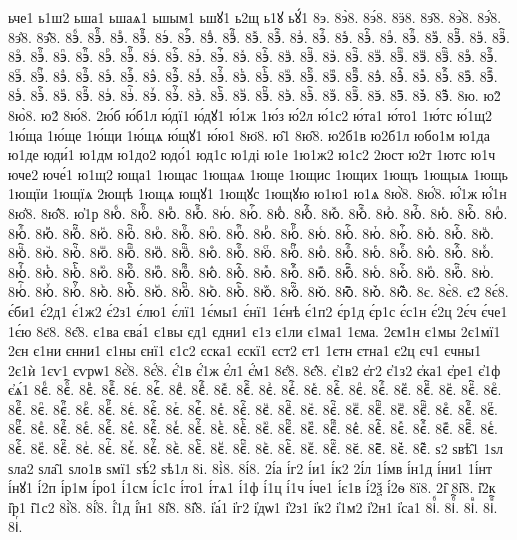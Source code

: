 {ьче1
ь1ш2
ьша1
ьшаѧ1
ьшым1
ьшꙋ1
ь2щ
ь1ꙋ
ьꙋ́1
8э.
8э̀8.
8э́8.
8ӭ8.
8э̑8.
8э҆̀8.
8э҆́8.
8э҆̈8.
8э҆̑8.
8эⷠ.
8эⷠ҇.
8эⷡ.
8эⷡ҇.
8эⷢ.
8эⷢ҇.
8эⷣ.
8эⷣ҇.
8эⷤ.
8эⷤ҇.
8эⷥ.
8эⷥ҇.
8эⷦ.
8эⷦ҇.
8эⷧ.
8эⷧ҇.
8эⷨ.
8эⷨ҇.
8эⷩ.
8эⷩ҇.
8эⷪ.
8эⷪ҇.
8эⷫ.
8эⷫ҇.
8эⷬ.
8эⷬ҇.
8эⷭ.
8эⷭ҇.
8эⷮ.
8эⷮ҇.
8эⷯ.
8эⷯ҇.
8эⷰ.
8эⷰ҇.
8эⷱ.
8эⷱ҇.
8эⷲ.
8эⷲ҇.
8эⷳ.
8эⷳ҇.
8эⷴ.
8эⷴ҇.
8эⷵ.
8эⷵ҇.
8эⷶ.
8эⷶ҇.
8эⷷ.
8эⷷ҇.
8эⷸ.
8эⷸ҇.
8эⷹ.
8эⷹ҇.
8эⷺ.
8эⷺ҇.
8эⷻ.
8эⷻ҇.
8эⷼ.
8эⷼ҇.
8эⷽ.
8эⷽ҇.
8эⷾ.
8эⷾ҇.
8эⷿ.
8эⷿ҇.
8эꙴ.
8эꙴ҇.
8эꙵ.
8эꙵ҇.
8эꙶ.
8эꙶ҇.
8эꙷ.
8эꙷ҇.
8эꙸ.
8эꙸ҇.
8эꙹ.
8эꙹ҇.
8эꙺ.
8эꙺ҇.
8эꙻ.
8эꙻ҇.
8э꙼.
8э꙼҇.
8э꙽.
8э꙽҇.
8ю.
ю2̀
8ю̀8.
ю2́
8ю́8.
2ю́б
ю́б1л
ю́дї1
ю́дꙋ1
ю́1ж
1ю́з
ю́2л
ю́1с2
ю́та1
ю́то1
1ю́тс
ю́1щ2
1ю́ща
1ю́ще
1ю́щи
1ю́щѧ
ю́щꙋ1
ю́ю1
8ю̈8.
ю̑1
8ю̑8.
ю2б1в
ю2б1л
юбо1м
ю1да
ю1де
юди́1
ю1дм
ю1до2
юдо́1
юд1с
ю1ді
ю1е
1ю1ж2
ю1с2
2юст
ю2т
1ютс
ю1ч
юче2
юче́1
ю1щ2
юща1
1ющас
1ющаѧ
1юще
1ющис
1ющих
1ющъ
1ющыѧ
1ющь
1ющїи
1ющїѧ
2ющѣ
1ющѧ
ющꙋ1
1ющꙋс
1ющꙋю
ю1ю1
ю1ѧ
8ю҆̀8.
8ю҆́8.
ю҆́1ж
ю҆́1н
8ю҆̈8.
8ю҆̑8.
ю҆1р
8юⷠ.
8юⷠ҇.
8юⷡ.
8юⷡ҇.
8юⷢ.
8юⷢ҇.
8юⷣ.
8юⷣ҇.
8юⷤ.
8юⷤ҇.
8юⷥ.
8юⷥ҇.
8юⷦ.
8юⷦ҇.
8юⷧ.
8юⷧ҇.
8юⷨ.
8юⷨ҇.
8юⷩ.
8юⷩ҇.
8юⷪ.
8юⷪ҇.
8юⷫ.
8юⷫ҇.
8юⷬ.
8юⷬ҇.
8юⷭ.
8юⷭ҇.
8юⷮ.
8юⷮ҇.
8юⷯ.
8юⷯ҇.
8юⷰ.
8юⷰ҇.
8юⷱ.
8юⷱ҇.
8юⷲ.
8юⷲ҇.
8юⷳ.
8юⷳ҇.
8юⷴ.
8юⷴ҇.
8юⷵ.
8юⷵ҇.
8юⷶ.
8юⷶ҇.
8юⷷ.
8юⷷ҇.
8юⷸ.
8юⷸ҇.
8юⷹ.
8юⷹ҇.
8юⷺ.
8юⷺ҇.
8юⷻ.
8юⷻ҇.
8юⷼ.
8юⷼ҇.
8юⷽ.
8юⷽ҇.
8юⷾ.
8юⷾ҇.
8юⷿ.
8юⷿ҇.
8юꙴ.
8юꙴ҇.
8юꙵ.
8юꙵ҇.
8юꙶ.
8юꙶ҇.
8юꙷ.
8юꙷ҇.
8юꙸ.
8юꙸ҇.
8юꙹ.
8юꙹ҇.
8юꙺ.
8юꙺ҇.
8юꙻ.
8юꙻ҇.
8ю꙼.
8ю꙼҇.
8ю꙽.
8ю꙽҇.
8є.
8є̀8.
є2́
8є́8.
є́би1
є́2д1
є́1ж2
є́2з1
є́лю1
є́лї1
1є́мы1
є́нї1
1є́нѣ
є́1п2
є́р1д
є́р1с
є́с1н
є́2ц
2є́ч
є́че1
1є́ю
8є̈8.
8є̑8.
є1ва
єва́1
є1вы
єд1
єдни1
є1з
є1ли
є1ма1
1єма.
2єм1н
є1мы
2є1мї1
2єн
є1ни
єнни1
є1ны
єнї1
є1с2
єска1
єскї1
єст2
єт1
1єтн
єтна1
є2ц
єч1
єчны1
2є1ѝ
1єѵ1
єѵрѡ1
8є҆̀8.
8є҆́8.
є҆́1в
є҆́1ж
є҆́л1
є҆́м1
8є҆̈8.
8є҆̑8.
є҆1в2
є҆г2
є҆1з2
є҆ка1
є҆ре1
є҆1ф
є҆ѧ́1
8єⷠ.
8єⷠ҇.
8єⷡ.
8єⷡ҇.
8єⷢ.
8єⷢ҇.
8єⷣ.
8єⷣ҇.
8єⷤ.
8єⷤ҇.
8єⷥ.
8єⷥ҇.
8єⷦ.
8єⷦ҇.
8єⷧ.
8єⷧ҇.
8єⷨ.
8єⷨ҇.
8єⷩ.
8єⷩ҇.
8єⷪ.
8єⷪ҇.
8єⷫ.
8єⷫ҇.
8єⷬ.
8єⷬ҇.
8єⷭ.
8єⷭ҇.
8єⷮ.
8єⷮ҇.
8єⷯ.
8єⷯ҇.
8єⷰ.
8єⷰ҇.
8єⷱ.
8єⷱ҇.
8єⷲ.
8єⷲ҇.
8єⷳ.
8єⷳ҇.
8єⷴ.
8єⷴ҇.
8єⷵ.
8єⷵ҇.
8єⷶ.
8єⷶ҇.
8єⷷ.
8єⷷ҇.
8єⷸ.
8єⷸ҇.
8єⷹ.
8єⷹ҇.
8єⷺ.
8єⷺ҇.
8єⷻ.
8єⷻ҇.
8єⷼ.
8єⷼ҇.
8єⷽ.
8єⷽ҇.
8єⷾ.
8єⷾ҇.
8єⷿ.
8єⷿ҇.
8єꙴ.
8єꙴ҇.
8єꙵ.
8єꙵ҇.
8єꙶ.
8єꙶ҇.
8єꙷ.
8єꙷ҇.
8єꙸ.
8єꙸ҇.
8єꙹ.
8єꙹ҇.
8єꙺ.
8єꙺ҇.
8єꙻ.
8єꙻ҇.
8є꙼.
8є꙼҇.
8є꙽.
8є꙽҇.
ѕ2
ѕвѣ̑1
1ѕл
ѕла2
ѕла̑1
ѕло1в
ѕмї1
ѕѣ́2
ѕѣ1л
8і.
8і̀8.
8і́8.
2і́а
і́г2
і́и1
і́к2
2і́л
1і́мв
і́н1д
і́ни1
1і́нт
і́нꙋ1
і́2п
і́р1м
і́ро1
і́1см
і́с1с
і́то1
і́тѧ1
і́1ф
і́1ц
і́1ч
і́че1
і́є1в
і́2ѯ
і́2ѳ
8ї8.
2і̑
8і̑8.
і̑2к
і̑р1
і̑1с2
8і҆̀8.
8і҆́8.
і҆́1д
і҆́н1
8і҆̈8.
8і҆̑8.
і҆а́1
і҆г2
і҆дѡ1
і҆2з1
і҆к2
і҆1м2
і҆2н1
і҆са1
8іⷠ.
8іⷠ҇.
8іⷡ.
8іⷡ҇.
8іⷢ.
}
